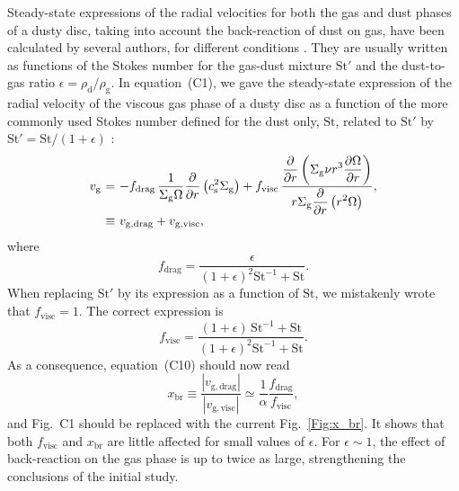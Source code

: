 \documentclass[a4paper,fleqn,usenatbib]{mnras}
\newcommand{\St}{\mathrm{St}}         %
\begin{document}
Steady-state expressions of the radial velocities for both the gas and dust phases of a dusty disc, taking into account the back-reaction of dust on gas, have been calculated by several authors, for different conditions \citep[e.g.][]{Nakagawa1986,Kretke2009,Dipierro2017,Kanagawa2017}. They are usually written as functions of the Stokes number for the gas-dust mixture $\St'$ and the dust-to-gas ratio $\epsilon=\rho_\mathrm{d}/\rho_\mathrm{g}$. In equation~(C1), we gave the steady-state expression of the radial velocity of the viscous gas phase of a dusty disc as a function of the more commonly used Stokes number defined for the dust only, $\St$, related to $\St'$ by $\St'=\St/(1+\epsilon)$ \citep{Price2015}:
%
\begin{equation}
\begin{array}{r@{\ }c@{\ }l}
v_\mathrm{g} 
& = & -f_\mathrm{drag} \, \displaystyle\frac{1}{\Sigma_\mathrm{g} \Omega} \frac{\partial}{\partial r}\left(c_\mathrm{s}^2 \Sigma_\mathrm{g} \right) + f_\mathrm{visc} \, \frac{\displaystyle\frac{\partial}{\partial r}\left( \Sigma_\mathrm{g} \nu r^3 \frac{\partial \Omega}{\partial r} \right)}{r \Sigma_\mathrm{g} \displaystyle \frac{\partial}{\partial r} \left( r^2 \Omega \right)}, \\
& \equiv & v_\mathrm{g,drag} + v_\mathrm{g,visc} ,
\label{eq:vgr}
\end{array}
\end{equation}
%
where
%
\begin{equation}
f_\mathrm{drag} = \frac{\epsilon}{(1 + \epsilon)^2 \St^{-1} + \St} . \label{eq:fdrag}
\end{equation}
%
When replacing $\St'$ by its expression as a function of $\St$, we mistakenly wrote that $f_\mathrm{visc}=1$. The correct expression is
%
\begin{equation}
f_\mathrm{visc} = \frac{(1 + \epsilon)\,\St^{-1} + \St}{(1 + \epsilon)^2 \St^{-1} + \St} . \label{eq:fvisc}
\end{equation}
%
As a consequence, equation~(C10) should now read
%
\begin{equation}
x_\mathrm{br} \equiv \frac{\left| v_\mathrm{g,drag} \right| }{ \left| v_\mathrm{g,visc} \right| } \simeq \frac{1}{\alpha} \frac{f_\mathrm{drag}}{f_\mathrm{visc}},
\label{eq:def_xbr}
\end{equation}
%
and Fig.~C1 should be replaced with the current Fig.~\ref{Fig:x_br}. It shows that both $f_\mathrm{visc}$ and $x_\mathrm{br}$ are little affected for small values of $\epsilon$. For $\epsilon\sim1$, the effect of back-reaction on the gas phase is up to twice as large, strengthening the conclusions of the initial study.
\end{document}
